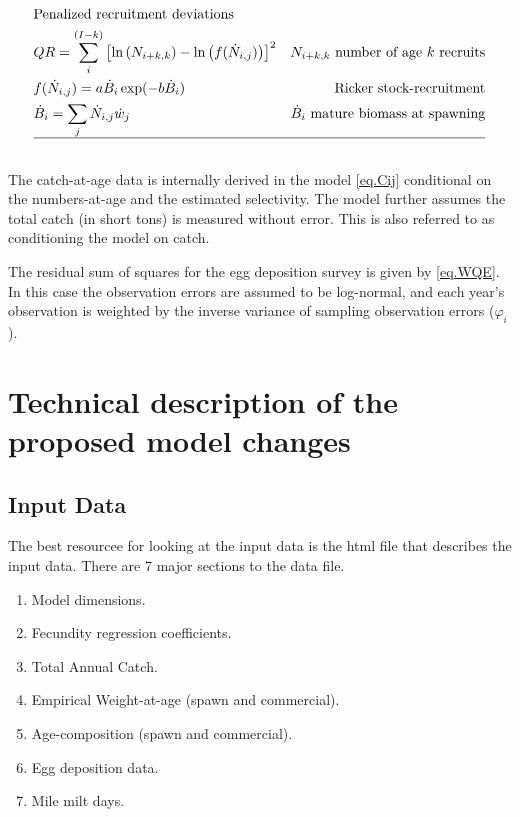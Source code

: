 \documentclass[12pt,letterpaper]{article}
\newcounter{saveEq}
\def\getEq{\setcounter{equation}{\value{saveEq}}}
\def\normalEq{ %
    \getEq
    \renewcommand{\theequation}{\arabic{section}.\arabic{equation}}}
\begin{document}
\begin{table}[ht]
\begin{align}
        &\mbox{Penalized recruitment deviations} \nonumber \\
        & QR = \sum_{i}^{(I-k)} \left[  \ln\left(N_{i+k,k}\right) 
        - \ln\left(f(\dot{N}_{i,j}) \right) \right]^2 
          & \mbox{$N_{i+k,k}$ number of age $k$ recruits}\\
        & f(\dot{N}_{i,j}) = a \dot{B}_i \exp(-b \dot{B}_i) &\mbox{Ricker stock-recruitment}\\
        & \dot{B}_i = \sum_j \dot{N}_{i,j} \dot{w}_j &\mbox{$\dot{B}_i$ mature biomass at spawning} \\
        \hline \nonumber
      \end{align}
      \normalEq
    \end{table}
    The catch-at-age data is internally derived in the model \eqref{eq.Cij} conditional on the numbers-at-age and the estimated selectivity. The model further assumes the total catch (in short tons) is measured without error.  This is also referred to as conditioning the model on catch.

    The residual sum of squares for the egg deposition survey is given by \eqref{eq.WQE}.  In this case the observation errors are assumed to be log-normal, and each year's observation is weighted by the inverse variance of sampling observation errors ($\varphi_i$).




  \clearpage
  \section{Technical description of the proposed model changes} %
  \label{sec:methods}
  
  \subsection{Input Data} %
  \label{sub:input_data}
    The best resourcee for looking at the input data is the html file that describes the input data. There are 7 major sections to the data file.
    \begin{enumerate}
      \item Model dimensions.
      \item Fecundity regression coefficients.
      \item Total Annual Catch.
      \item Empirical Weight-at-age (spawn and commercial).
      \item Age-composition (spawn and commercial).
      \item Egg deposition data.
      \item Mile milt days.
    \end{enumerate}
\end{document}
